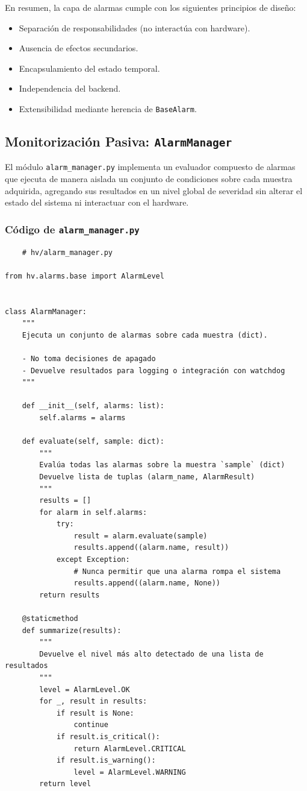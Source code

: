 \documentclass{article}
\begin{document}
En resumen, la capa de alarmas cumple con los siguientes principios de diseño:
\begin{itemize}
    \item Separación de responsabilidades (no interactúa con hardware).
    \item Ausencia de efectos secundarios.
    \item Encapsulamiento del estado temporal.
    \item Independencia del backend.
    \item Extensibilidad mediante herencia de \texttt{BaseAlarm}.
\end{itemize}


\subsection{Monitorización Pasiva: \texttt{AlarmManager}}

El módulo \texttt{alarm\_manager.py} implementa un evaluador compuesto de alarmas que ejecuta de manera aislada un conjunto de condiciones sobre cada muestra adquirida, agregando sus resultados en un nivel global de severidad sin alterar el estado del sistema ni interactuar con el hardware.

\subsubsection{Código de \texttt{alarm\_manager.py}}

\begin{lstlisting}
    # hv/alarm_manager.py

from hv.alarms.base import AlarmLevel


class AlarmManager:
    """
    Ejecuta un conjunto de alarmas sobre cada muestra (dict).

    - No toma decisiones de apagado
    - Devuelve resultados para logging o integración con watchdog
    """

    def __init__(self, alarms: list):
        self.alarms = alarms

    def evaluate(self, sample: dict):
        """
        Evalúa todas las alarmas sobre la muestra `sample` (dict)
        Devuelve lista de tuplas (alarm_name, AlarmResult)
        """
        results = []
        for alarm in self.alarms:
            try:
                result = alarm.evaluate(sample)
                results.append((alarm.name, result))
            except Exception:
                # Nunca permitir que una alarma rompa el sistema
                results.append((alarm.name, None))
        return results

    @staticmethod
    def summarize(results):
        """
        Devuelve el nivel más alto detectado de una lista de resultados
        """
        level = AlarmLevel.OK
        for _, result in results:
            if result is None:
                continue
            if result.is_critical():
                return AlarmLevel.CRITICAL
            if result.is_warning():
                level = AlarmLevel.WARNING
        return level
\end{lstlisting}
\end{document}
